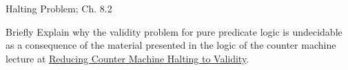 \documentclass[handout]{mcs}
\begin{document}

\begin{staffnotes}
	Halting Problem;  Ch. 8.2
\end{staffnotes}

\begin{problem}
Briefly Explain why the validity problem for pure predicate logic is
undecidable as a consequence of the material presented in the logic of
the counter machine lecture at
\href{https://courses.csail.mit.edu/6.042/spring16/predicate-logic7.pdf}{Reducing
  Counter Machine Halting to Validity}.

\begin{solution}

\end{solution}

\end{problem}

 





\end{document}
